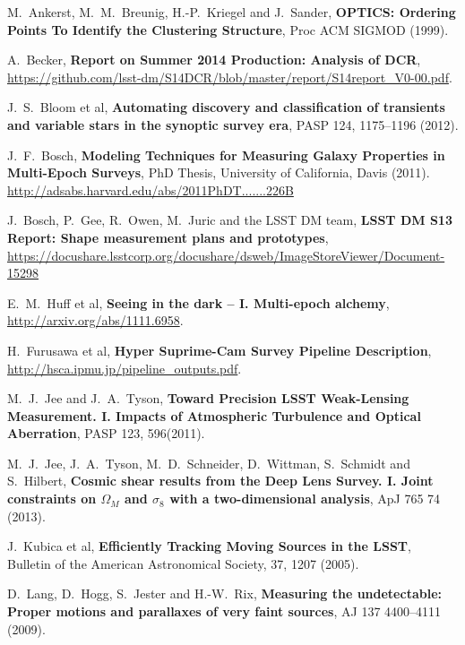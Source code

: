 \documentclass[12pt]{article}
\begin{document}
\begin{thebibliography}{10}

 M.~Ankerst, M.~M.~Breunig, H.-P.~Kriegel and J.~Sander,
  \textbf{OPTICS: Ordering Points To Identify the Clustering Structure},
  Proc ACM SIGMOD (1999).

 A.~Becker,
  \textbf{Report on Summer 2014 Production: Analysis of DCR},
  \url{https://github.com/lsst-dm/S14DCR/blob/master/report/S14report_V0-00.pdf}.

 J.~S.~Bloom et al,
  \textbf{Automating discovery and classification of transients and variable stars in the synoptic survey era},
  PASP 124, 1175--1196 (2012).

 J.~F.~Bosch,
  \textbf{Modeling Techniques for Measuring Galaxy Properties in Multi-Epoch Surveys},
  PhD Thesis, University of California, Davis (2011). \url{http://adsabs.harvard.edu/abs/2011PhDT.......226B}

 J.~Bosch, P.~Gee, R.~Owen, M.~Juric and the LSST DM team,
  \textbf{LSST DM S13 Report: Shape measurement plans and prototypes},
  \url{https://docushare.lsstcorp.org/docushare/dsweb/ImageStoreViewer/Document-15298}

 E.~M.~Huff et al,
  \textbf{Seeing in the dark -- I. Multi-epoch alchemy},
  \url{http://arxiv.org/abs/1111.6958}.

 H.~Furusawa et al,
  \textbf{Hyper Suprime-Cam Survey Pipeline Description},
  \url{http://hsca.ipmu.jp/pipeline_outputs.pdf}.

 M.~J.~Jee and J.~A.~Tyson,  \textbf{Toward
  Precision LSST Weak-Lensing Measurement. I. Impacts of Atmospheric
  Turbulence and Optical Aberration}, PASP 123, 596(2011).

 M.~J.~Jee, J.~A.~Tyson, M.~D.~Schneider, D.~Wittman, S.~Schmidt and S.~Hilbert,
  \textbf{Cosmic shear results from the Deep Lens Survey. I. Joint constraints on $\Omega_M$ and $\sigma_8$ with a two-dimensional analysis},
  ApJ 765 74 (2013).

 J.~Kubica et al,
  \textbf{Efficiently Tracking Moving Sources in the LSST},
  Bulletin of the American Astronomical Society, 37, 1207 (2005).

 D.~Lang, D.~Hogg, S.~Jester and H.-W.~Rix,
  \textbf{Measuring the undetectable: Proper motions and parallaxes of very faint sources},
  AJ 137 4400--4111 (2009).


\end{thebibliography}
\end{document}
